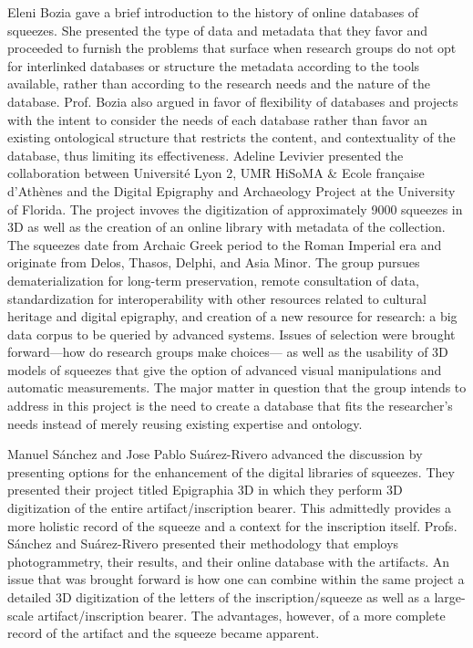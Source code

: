 \documentclass[amsthm,ebook]{saparticle}
\begin{document}
	Eleni Bozia gave a brief introduction to the history of online databases of squeezes. She presented the type of data and metadata that they favor and proceeded to furnish the problems that surface when research groups do not opt for interlinked databases or structure the metadata according to the tools available, rather than according to the research needs and the nature of the database. Prof. Bozia also argued in favor of flexibility of databases and projects with the intent to consider the needs of each database rather than favor an existing ontological structure that restricts the content, and contextuality of the database, thus limiting its effectiveness.
Adeline Levivier presented the collaboration between Université Lyon 2, UMR HiSoMA \& Ecole française d’Athènes and the Digital Epigraphy and Archaeology Project at the University of Florida. The project invoves the digitization of approximately 9000 squeezes in 3D as well as the creation of an online library with metadata of the collection. The squeezes date from Archaic Greek period to the Roman Imperial era and originate from Delos, Thasos, Delphi, and Asia Minor. The group pursues dematerialization for long-term preservation, remote consultation of data, standardization for interoperability with other resources related to cultural heritage and digital epigraphy, and creation of a new resource for research: a big data corpus to  be queried by advanced systems. Issues of selection were brought forward—how do research groups make choices— as well as the usability of 3D models of squeezes that give the option of advanced visual manipulations and automatic measurements. The major matter in question that the group intends to address in this project is the need to create a database that fits the researcher’s needs instead of merely reusing existing expertise and ontology. 

	Manuel Sánchez and Jose Pablo Su\'arez-Rivero advanced the discussion by presenting options for the enhancement of the digital libraries of squeezes. They presented their project titled Epigraphia 3D in which they perform 3D digitization of the entire artifact/inscription bearer. This admittedly provides a more holistic record of the squeeze and a context for the inscription itself. Profs. Sánchez and Su\'arez-Rivero presented their methodology that employs photogrammetry, their results, and their online database with the artifacts. An issue that was brought forward is how one can combine within the same project a detailed 3D digitization of the letters of the inscription/squeeze as well as a large-scale artifact/inscription bearer. The advantages, however, of a more complete record of the artifact and the squeeze became apparent. 
\end{document}
